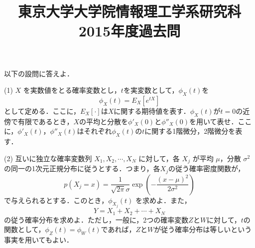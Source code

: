 \documentclass[a4j]{jarticle}
\title{東京大学大学院情報理工学系研究科2015年度過去問}
\author{}
\date{}
\begin{document}
\thispagestyle{empty}
\maketitle
\pagebreak

\section{}


\section{}


\section{}

\begin{screen}
 以下の設問に答えよ．
\end{screen}

\begin{screen}
 (1) $X$ を実数値をとる確率変数とし，$t$を実変数として，$\phi_X(t)$を
 $$\phi_X(t) = E_X\left[e^{tX}\right]$$
 として定める．ここに，$E_X\left[\cdot\right]$は$X$に関する期待値を表す．$\phi_X(t)$が$t=0$の近傍で有限であるとき，$X$の平均と分散を$\phi'_X(0)$と$\phi''_X(0)$を用いて表せ．ここに，$\phi'_X(t)$，$\phi''_X(t)$はそれぞれ$\phi_X(t)$の$t$に関する1階微分，2階微分を表す．
\end{screen}

\begin{screen}
 (2) 互いに独立な確率変数列 $X_1,X_2,\cdots,X_N$ に対して，各 $X_j$ が平均 $\mu$，分散 $\sigma^2$ の同一の1次元正規分布に従うとする．つまり，各$X_j$の従う確率密度関数が，
 $$p(X_j=x) = \frac{1}{\sqrt{2 \pi}\sigma}\exp\left(- \frac{(x-\mu)^2}{2\sigma^2}\right)$$
 で与えられるとする．このとき，$\phi_{X_j}(t)$ を求めよ．また，
 $$ Y = X_1 + X_2 + \cdots + X_N$$
 の従う確率分布を求めよ．ただし，一般に，2つの確率変数$Z$と$W$に対して，$t$の関数として，$\phi_Z(t)=\phi_W(t)$であれば，$Z$と$W$が従う確率分布は等しいという事実を用いてもよい．
\end{screen}
\end{document}
